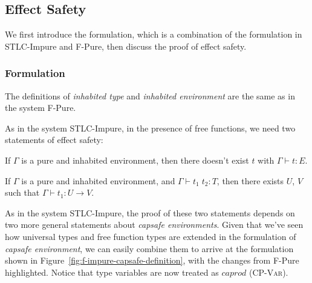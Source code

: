 \subsection{Effect Safety}

We first introduce the formulation, which is a combination of the
formulation in STLC-Impure and F-Pure, then discuss the proof of
effect safety.

\subsubsection{Formulation}

The definitions of \emph{inhabited type} and \emph{inhabited
  environment} are the same as in the system F-Pure.

As in the system STLC-Impure, in the presence of free functions, we
need two statements of effect safety:

\begin{definition}
  If $\Gamma$ is a pure and inhabited environment, then there
  doesn't exist $t$ with $\Gamma \vdash t : E$.
\end{definition}

\begin{definition}
  If $\Gamma$ is a pure and inhabited environment, and
  $\Gamma \vdash t_1 \; t_2 : T$, then there exists $U$, $V$ such that
  $\Gamma \vdash t_1 : U \to V$.
\end{definition}

As in the system STLC-Impure, the proof of these two statements
depends on two more general statements about \emph{capsafe
  environments}. Given that we've seen how universal types and free
function types are extended in the formulation of \emph{capsafe
  environment}, we can easily combine them to arrive at the
formulation shown in Figure~\ref{fig:f-impure-capsafe-definition},
with the changes from F-Pure highlighted. Notice that type variables
are now treated as $caprod$ (\textsc{CP-Var}).

